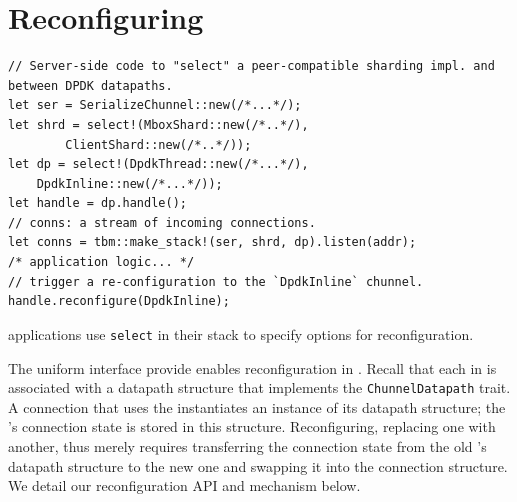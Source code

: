 \section{Reconfiguring \tunnels}\label{s:reconfig}
\begin{listing}[t]
\begin{verbatim}
// Server-side code to "select" a peer-compatible sharding impl. and between DPDK datapaths. 
let ser = SerializeChunnel::new(/*...*/);
let shrd = select!(MboxShard::new(/*..*/), 
        ClientShard::new(/*..*/));
let dp = select!(DpdkThread::new(/*...*/),
    DpdkInline::new(/*...*/));
let handle = dp.handle();
// conns: a stream of incoming connections.
let conns = tbm::make_stack!(ser, shrd, dp).listen(addr);
/* application logic... */
// trigger a re-configuration to the `DpdkInline` chunnel.
handle.reconfigure(DpdkInline);
\end{verbatim}
\vspace{-10pt}
\caption{\name applications use \texttt{select} in their \tunnel stack to specify options for reconfiguration.}\label{l:select}
\vspace{-10pt}
\end{listing}
\noindent
The uniform interface \tunnels provide enables reconfiguration in \name.
Recall that each \tunnel in \name is associated with a datapath structure that implements the \texttt{ChunnelDatapath} trait. 
A \name connection that uses the \tunnel instantiates an instance of its datapath structure; the \tunnel's connection state is stored in this structure.
Reconfiguring, \ie replacing one \tunnel with another, thus merely requires transferring the connection state from the old \tunnel's datapath structure to the new one and swapping it into the connection structure. 
We detail our reconfiguration API and mechanism below.


